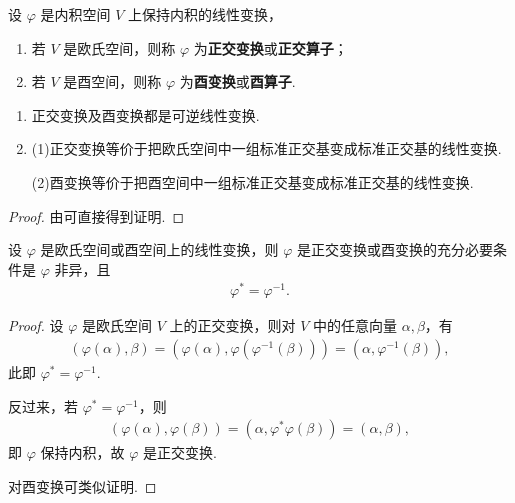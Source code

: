 \documentclass[../../main.tex]{subfiles}
\begin{document}
\begin{definition}
设 $\varphi$ 是内积空间 $V$ 上保持内积的线性变换，
\begin{enumerate}
\item 若 $V$ 是欧氏空间，则称 $\varphi$ 为\textbf{正交变换}或\textbf{正交算子}；

\item 若 $V$ 是酉空间，则称 $\varphi$ 为\textbf{酉变换}或\textbf{酉算子}.
\end{enumerate}
\end{definition}

\begin{theorem}\label{theorem:正交变换和酉变换的基本性质}
\begin{enumerate}
\item 正交变换及酉变换都是可逆线性变换.

\item (1)正交变换等价于把欧氏空间中一组标准正交基变成标准正交基的线性变换.

(2)酉变换等价于把酉空间中一组标准正交基变成标准正交基的线性变换.
\end{enumerate}
\end{theorem}
\begin{proof}
由可直接得到证明.
\end{proof}

\begin{theorem}\label{theorem:正交变换或酉变换g关于伴随算子的充要条件}
设 $\varphi$ 是欧氏空间或酉空间上的线性变换，则 $\varphi$ 是正交变换或酉变换的充分必要条件是 $\varphi$ 非异，且
\begin{align*}
\varphi^* = \varphi^{-1}.
\end{align*}
\end{theorem}
\begin{proof}
设 $\varphi$ 是欧氏空间 $V$ 上的正交变换，则对 $V$ 中的任意向量 $\alpha,\beta$，有
\begin{align*}
(\varphi(\alpha),\beta) = (\varphi(\alpha),\varphi(\varphi^{-1}(\beta))) = (\alpha,\varphi^{-1}(\beta)),
\end{align*}
此即 $\varphi^* = \varphi^{-1}$.

反过来，若 $\varphi^* = \varphi^{-1}$，则
\begin{align*}
(\varphi(\alpha),\varphi(\beta)) = (\alpha,\varphi^*\varphi(\beta)) = (\alpha,\beta),
\end{align*}
即 $\varphi$ 保持内积，故 $\varphi$ 是正交变换.

对酉变换可类似证明.
\end{proof}
\end{document}
